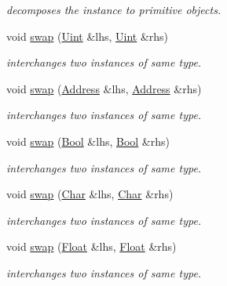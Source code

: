\begin{DoxyCompactItemize}
\begin{DoxyCompactList}\small\item\em decomposes the instance to primitive objects. \end{DoxyCompactList}\item 
void \hyperlink{namespacehryky_1_1reduction_a630b9e9fb5ea8a9bedc9ef8cb444b8ff}{swap} (\hyperlink{classhryky_1_1reduction_1_1_uint}{Uint} \&lhs, \hyperlink{classhryky_1_1reduction_1_1_uint}{Uint} \&rhs)
\begin{DoxyCompactList}\small\item\em interchanges two instances of same type. \end{DoxyCompactList}\item 
void \hyperlink{namespacehryky_1_1reduction_a493c83efdf5f9e9c49ba77e1b65325a1}{swap} (\hyperlink{classhryky_1_1reduction_1_1_address}{Address} \&lhs, \hyperlink{classhryky_1_1reduction_1_1_address}{Address} \&rhs)
\begin{DoxyCompactList}\small\item\em interchanges two instances of same type. \end{DoxyCompactList}\item 
void \hyperlink{namespacehryky_1_1reduction_abe371e51d7febd17563d05898a8d3858}{swap} (\hyperlink{classhryky_1_1reduction_1_1_bool}{Bool} \&lhs, \hyperlink{classhryky_1_1reduction_1_1_bool}{Bool} \&rhs)
\begin{DoxyCompactList}\small\item\em interchanges two instances of same type. \end{DoxyCompactList}\item 
void \hyperlink{namespacehryky_1_1reduction_afad4779ca77de2110a33f09cb808fe34}{swap} (\hyperlink{classhryky_1_1reduction_1_1_char}{Char} \&lhs, \hyperlink{classhryky_1_1reduction_1_1_char}{Char} \&rhs)
\begin{DoxyCompactList}\small\item\em interchanges two instances of same type. \end{DoxyCompactList}\item 
void \hyperlink{namespacehryky_1_1reduction_a13c753c6b5208cdca676005ff45b03b3}{swap} (\hyperlink{classhryky_1_1reduction_1_1_float}{Float} \&lhs, \hyperlink{classhryky_1_1reduction_1_1_float}{Float} \&rhs)
\begin{DoxyCompactList}\small\item\em interchanges two instances of same type. \end{DoxyCompactList}\item 

\end{DoxyCompactItemize}
